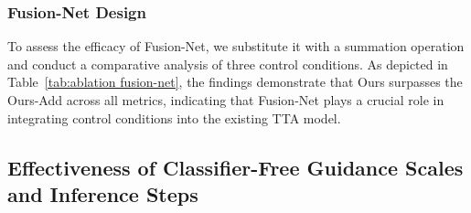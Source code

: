 \documentclass[letterpaper]{article} %
\begin{document}
\begin{table}[!h]\footnotesize
    \centering
    \caption{The control performance with different designs for the Fusion-Net.}
    \label{tab:ablation fusion-net}
\end{table}

\subsubsection{Fusion-Net Design} To assess the efficacy of Fusion-Net, we substitute it with a summation operation and conduct a comparative analysis of three control conditions. As depicted in Table~\ref{tab:ablation fusion-net}, the findings demonstrate that Ours surpasses the Ours-Add across all metrics, indicating that Fusion-Net plays a crucial role in integrating control conditions into the existing TTA model.

\subsection{Effectiveness of Classifier-Free Guidance Scales and Inference Steps}
\end{document}
